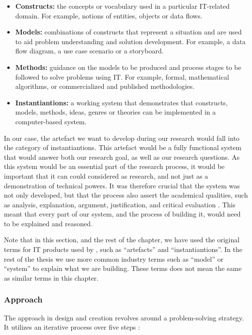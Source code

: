 \begin{itemize}
    \item\textbf{Constructs:} the concepts or vocabulary used in a particular IT-related domain. For example, notions of entities, objects or data flows.
    \item\textbf{Models:} combinations of constructs that represent a situation and are used to aid problem understanding and solution development. For example, a data flow diagram, a use case scenario or a storyboard.
    \item\textbf{Methods:} guidance on the models to be produced and process stages to be followed to solve problems using IT. For example, formal, mathematical algorithms, or commercialized and published methodologies.
    \item\textbf{Instantiantions:} a working system that demonstrates that constructs, models, methods, ideas, genres or theories can be implemented in a computer-based system.
\end{itemize}

In our case, the artefact we want to develop during our research would fall into the category of instantiantions. This artefact would be a fully functional system that would answer both our research goal, as well as our research questions.  As this system would be an essential part of the research process, it would be important that it can could considered as research, and not just as a demonstration of technical powers. It was therefore crucial that the system was not only developed, but that the process also assert the academical qualities, such as analysis, explanation, argument, justification, and critical evaluation \citep{oates2005researching}. This meant that every part of our system, and the process of building it, would need to be explained and reasoned.

Note that in this section, and the rest of the chapter, we have used the original terms for IT products used by \cite{oates2005researching}, such as ``artefacts'' and ``instantiantions''. In the rest of the thesis we use more common industry terms such as ``model'' or ``system'' to explain what we are building. These terms does not mean the same as similar terms in this chapter.

\subsubsection{Approach}
\label{methodology-design-and-creation-approach}
The approach in design and creation revolves around a problem-solving strategy. It utilizes an iterative process over five steps \citep{vaishnavi2004design, oates2005researching}:

